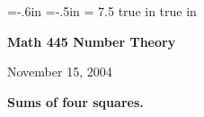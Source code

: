 \def\cmb{\MidnightBlue}	  %
\def\cnb{\NavyBlue}	  %
\def\crb{\RoyalBlue}	  %
\def\cce{\Cerulean}	  %
\def\ccy{\Cyan}		  %
\def\cpb{\ProcessBlue}	  %
\def\csb{\SkyBlue}	  %
\def\ctu{\Turquoise}	  %
\def\ctb{\TealBlue}	  %
\def\caq{\Aquamarine}	  %
\def\cbg{\BlueGreen}	  %
\def\cem{\Emerald}	  %
\def\cjg{\JungleGreen}	  %
\def\csg{\SeaGreen}	  %
\def\cgg{\Green}	  %
\def\cfg{\ForestGreen}	  %
\def\cpg{\PineGreen}	  %
\def\clg{\LimeGreen}	  %
\def\cyg{\YellowGreen}	  %
\def\cspg{\SpringGreen}	  %
\def\cog{\OliveGreen}	  %
\def\pars{\RawSienna}	  %
\def\cse{\Sepia}		  %
\def\cbr{\Brown}		  %
\def\cta{\Tan}		  %
\def\cgr{\Gray}		  %
\def\cbl{\Black}		  %
\def\cwh{\White}		  %


\voffset=-.6in
\hoffset=-.5in
\hsize = 7.5 true in
 true in


\overfullrule=0pt


\def\ctln{\centerline}
\def\u{\underbar}
\def\ssk{\smallskip}
\def\msk{\medskip}
\def\bsk{\bigskip}
\def\hsk{\hskip.1in}
\def\hhsk{\hskip.2in}
\def\dsl{\displaystyle}
\def\hskp{\hskip1.5in}

\def\lra{$\Leftrightarrow$ }


\ctln{\bf Math 445 Number Theory}

\ssk

\ctln{November 15, 2004}

\msk

{\bf Sums of four squares.}

